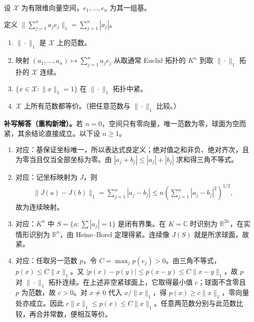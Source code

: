 \documentclass[../../main.tex]{subfiles}
\begin{document}
\begin{exercise}\label{exercise:ch05-finite-dimensional-norms}
设 $\mathcal X$ 为有限维向量空间，$e_1,\ldots,e_n$ 为其一组基。
\begin{definition*}[本题的坐标范数]\label{definition:ch05-coordinate-l1-norm}
定义 $\|\sum_{j=1}^na_je_j\|_1=\sum_{j=1}^n|a_j|$。
\end{definition*}
\begin{enumerate}
\item\label{item:ch05-finite-dim-l1-norm} $\|\cdot\|_1$ 是 $\mathcal X$ 上的范数。
\item\label{item:ch05-finite-dim-coordinate-map} 映射 $(a_1,\ldots,a_n)\mapsto\sum_{j=1}^na_je_j$ 从取通常 Euclid 拓扑的 $K^n$ 到取 $\|\cdot\|_1$ 拓扑的 $\mathcal X$ 连续。
\item\label{item:ch05-finite-dim-sphere} $\{x\in\mathcal X:\|x\|_1=1\}$ 在 $\|\cdot\|_1$ 拓扑中紧。
\item\label{item:ch05-finite-dim-equivalence} $\mathcal X$ 上所有范数都等价。（把任意范数与 $\|\cdot\|_1$ 比较。）
\end{enumerate}
\end{exercise}
\begin{solution}
\textbf{补写解答（重构新增）。}若 $n=0$，空间只有零向量，唯一范数为零，球面为空而紧，其余结论直接成立。以下设 $n\ge1$。
\begin{enumerate}
\item 对应：基保证坐标唯一，所以表达式良定义；绝对值之和非负、绝对齐次，且为零当且仅当全部坐标为零。由 $|a_j+b_j|\le|a_j|+|b_j|$ 求和得三角不等式。
\item 对应：记坐标映射为 $J$，则
\begin{align*}
\|J(a)-J(b)\|_1=\sum_{j=1}^n|a_j-b_j|
\le n\left(\sum_{j=1}^n|a_j-b_j|^2\right)^{1/2},
\end{align*}
故为连续映射。
\item 对应：$K^n$ 中 $S=\{a:\sum|a_j|=1\}$ 是闭有界集。在 $K=\mathbb C$ 时识别为 $\mathbb R^{2n}$，在实情形识别为 $\mathbb R^n$，由 Heine--Borel 定理得紧。连续像 $J(S)$ 就是所求球面，故紧。
\item 对应：任取另一范数 $p$，令 $C=\max_jp(e_j)>0$。由三角不等式，$p(x)\le C\|x\|_1$。又 $|p(x)-p(y)|\le p(x-y)\le C\|x-y\|_1$，故 $p$ 对 $\|\cdot\|_1$ 拓扑连续。在上述非空紧球面上，它取得最小值 $c$；球面不含零且 $p$ 为范数，故 $c>0$。对 $x\ne0$ 代入 $x/\|x\|_1$，得 $p(x)\ge c\|x\|_1$，零向量处亦成立。因此 $c\|x\|_1\le p(x)\le C\|x\|_1$。任意两范数分别与此范数比较，再合并常数，便相互等价。
\end{enumerate}
\end{solution}
\end{document}
